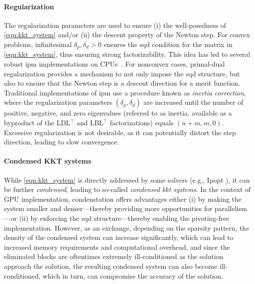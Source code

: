 \documentclass{article}
\begin{document}
\paragraph{Regularization}
The regularization parameters are used to  ensure (i) the well-posedness of \cref{eqn:kkt_system} and/or (ii) the descent property of the Newton step.
For convex problems, infinitesimal $\delta_p, \delta_d > 0$ ensures the \gls*{sqd} condition for the matrix in \eqref{eqn:kkt_system}, thus ensuring strong factorizability. This idea has led to several robust \gls{ipm} implementations on CPUs~\cite{friedlanderPrimalDualRegularized2012}. For nonconvex cases, primal-dual regularization provides a mechanism to not only impose the \gls*{sqd} structure, but also to ensure that the Newton step is a descent direction for a merit function. Traditional implementations of \gls{ipm} use a procedure known as \emph{inertia correction}, where the regularization parameters $(\delta_p, \delta_d)$ are increased until the number of positive, negative, and zero eigenvalues (referred to as inertia, available as a byproduct of the LDL$^\top$ and LBL$^\top$ factorizations) equals $(n+m, m, 0)$.
Excessive regularization is not desirable, as it can potentially distort the step direction, leading to slow convergence.

\paragraph{Condensed KKT systems}
While \cref{eqn:kkt_system} is directly addressed by some solvers (e.g., Ipopt \cite{wachterImplementationInteriorpointFilter2006}), it can be further \emph{condensed}, leading to so-called \emph{condensed \gls*{kkt} systems}. In the context of GPU implementation, condenstation offers advantages either (i) by making the system smaller and denser—thereby providing more opportunities for parallelism—or (ii) by enforcing the \gls*{sqd} structure---thereby enabling the pivoting-free implementation. However, as an exchange, depending on the sparsity pattern, the density of the condensed system can increase significantly, which can lead to increased memory requirements and computational overhead, and since the eliminated blocks are oftentimes extremely ill-conditioned as the solution approach the solution, the resulting condensed system can also become ill-conditioned, which in turn, can compromise the accuracy of the solution. 
\end{document}
